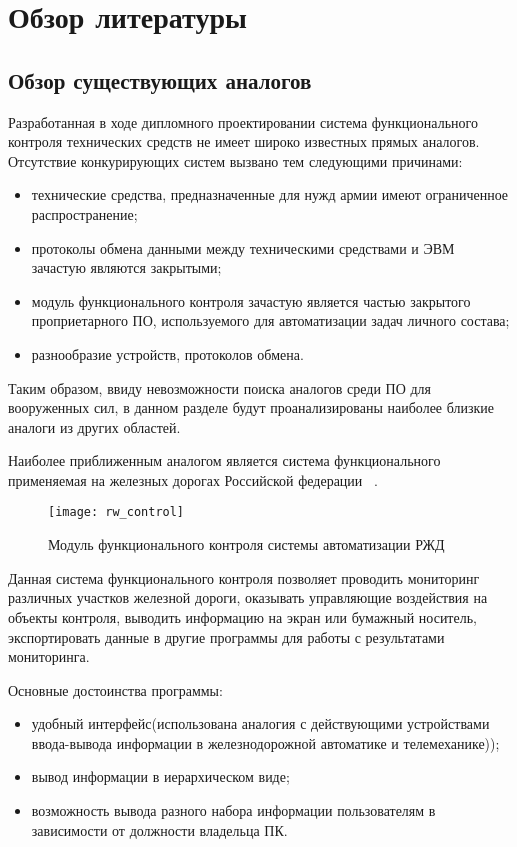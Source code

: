 \section{Обзор литературы}
\label{sec:lit_review}

\subsection{Обзор существующих аналогов}
\label{sub:lit_review:analogues}
Разработанная в ходе дипломного проектировании система функционального контроля технических средств не имеет широко
известных прямых аналогов. Отсутствие конкурирующих систем вызвано тем следующими причинами:
\begin{itemize}
	\item технические средства, предназначенные для нужд армии имеют ограниченное распространение;
	\item протоколы обмена данными между техническими средствами и ЭВМ зачастую являются закрытыми;
	\item модуль функционального контроля зачастую является частью закрытого проприетарного ПО, используемого для
		автоматизации задач личного состава;
	\item разнообразие устройств, протоколов обмена.
\end{itemize}

Таким образом, ввиду невозможности поиска аналогов среди ПО для вооруженных сил, в данном разделе будут проанализированы
наиболее близкие аналоги из других областей.

Наиболее приближенным аналогом является система функционального применяемая на железных дорогах Российской федерации
~\cite{rus_rails}.

\begin{figure}[ht]
	\centering
	\texttt{[image: rw\_control]}
	\caption{Модуль функционального контроля системы автоматизации РЖД~\cite{rus_rails}}
	\label{fig:lit_reiview:analogues:rw_control}
\end{figure}

Данная система функционального контроля позволяет проводить мониторинг различных участков железной дороги, оказывать
управляющие воздействия на объекты контроля, выводить информацию на экран или бумажный носитель, экспортировать данные в
другие программы для работы с результатами мониторинга.

Основные достоинства программы:
\begin{itemize}
	\item удобный интерфейс(использована аналогия с действующими устройствами ввода-вывода информации в
		железнодорожной автоматике и телемеханике));
	\item вывод информации в иерархическом виде;
	\item возможность вывода разного набора информации пользователям в зависимости от должности владельца ПК.
\end{itemize}

